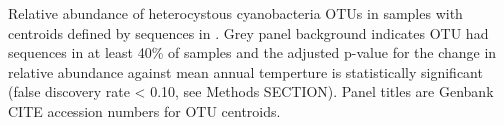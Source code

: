 Relative abundance of heterocystous cyanobacteria OTUs in \citet{Garcia_Pichel_2013} samples with centroids defined by sequences in \citet{Yeager}. Grey panel background indicates OTU had sequences in at least 40\% of samples and the adjusted p-value for the change in relative abundance against mean annual temperture is statistically significant (false discovery rate < 0.10, see Methods SECTION). Panel titles are Genbank CITE accession numbers for OTU centroids. 